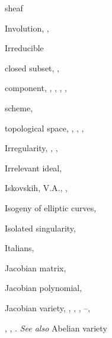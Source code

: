 {{\noindent\hspace*{15.0bp}sheaf\par
\noindent\hspace*{0.0bp}Involution, , \par
\noindent\hspace*{0.0bp}Irreducible\par
\noindent\hspace*{7.5bp}closed subset, , \par
\noindent\hspace*{7.5bp}component, , , , , \par
\noindent\hspace*{7.5bp}scheme, \par
\noindent\hspace*{7.5bp}topological space, , , , \par
\noindent\hspace*{0.0bp}Irregularity, , , \par
\noindent\hspace*{0.0bp}Irrelevant ideal, \par
\noindent\hspace*{0.0bp}Iskovskih, V.A., , \par
\noindent\hspace*{0.0bp}Isogeny of elliptic curves, \par
\noindent\hspace*{0.0bp}Isolated singularity, \par
\noindent\hspace*{0.0bp}Italians, \par
\vspace{8.55bp}
\noindent\hspace*{0.0bp}Jacobian matrix, \par
\noindent\hspace*{0.0bp}Jacobian polynomial, \par
\noindent\hspace*{0.0bp}Jacobian variety, , , , --,\par
\noindent\hspace*{15.0bp}, , . \emph{See also} Abelian variety\par
}}
